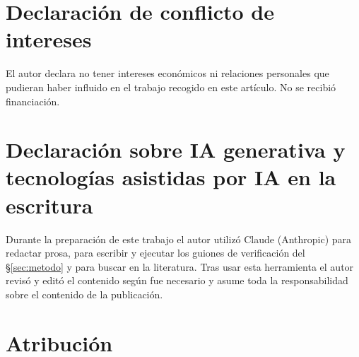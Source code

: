 \documentclass[11pt,a4paper]{article}
\theoremstyle{definition}
\begin{document}
\section*{Declaración de conflicto de intereses}

\noindent El autor declara no tener intereses económicos ni relaciones personales que pudieran haber
influido en el trabajo recogido en este artículo. No se recibió financiación.

\section*{Declaración sobre IA generativa y tecnologías asistidas por IA en la escritura}

\noindent Durante la preparación de este trabajo el autor utilizó Claude (Anthropic) para redactar
prosa, para escribir y ejecutar los guiones de verificación del \S\ref{sec:metodo} y para buscar en
la literatura. Tras usar esta herramienta el autor revisó y editó el contenido según fue necesario y
asume toda la responsabilidad sobre el contenido de la publicación.

\section*{Atribución}
\end{document}
